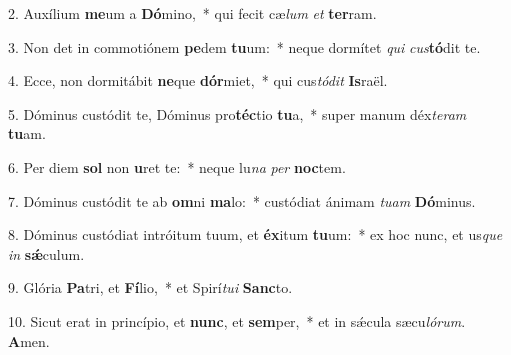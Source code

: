2. Auxílium \textbf{me}um a \textbf{Dó}mino,~*  qui fecit cæ\textit{lum} \textit{et} \textbf{ter}ram.\

3. Non det in commotiónem \textbf{pe}dem \textbf{tu}um:~*  neque dormítet \textit{qui} \textit{cus}\textbf{tó}dit te.\

4. Ecce, non dormitábit \textbf{ne}que \textbf{dór}miet,~*  qui cus\textit{tó}\textit{dit} \textbf{Is}raël.\

5. Dóminus custódit te, Dóminus pro\textbf{téc}tio \textbf{tu}a,~*  super manum déx\textit{te}\textit{ram} \textbf{tu}am.\

6. Per diem \textbf{sol} non \textbf{u}ret te:~*  neque lu\textit{na} \textit{per} \textbf{noc}tem.\

7. Dóminus custódit te ab \textbf{om}ni \textbf{ma}lo:~*  custódiat ánimam \textit{tu}\textit{am} \textbf{Dó}minus.\

8. Dóminus custódiat intróitum tuum, et \textbf{éx}itum \textbf{tu}um:~*  ex hoc nunc, et us\textit{que} \textit{in} \textbf{sǽ}culum.\

9. Glória \textbf{Pa}tri, et \textbf{Fí}lio,~*  et Spirí\textit{tu}\textit{i} \textbf{Sanc}to.\

10. Sicut erat in princípio, et \textbf{nunc}, et \textbf{sem}per,~*  et in sǽcula sæcu\textit{ló}\textit{rum}. \textbf{A}men.\

